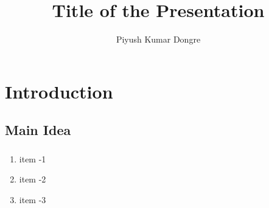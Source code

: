 \documentclass[aspectratio=169]{beamer}
\title[Short Title]{Title of the Presentation}
\author[Piyush]{Piyush Kumar Dongre}
\begin{document}
\begin{frame}
    \titlepage
\end{frame}

\section{Introduction}\label{sec:introduction}


\subsection{Main Idea}\label{sec:mainidea}
\begin{frame}
    \frametitle{\subsecname}
    \begin{enumerate}
        \item item -1

              \vspace{1cm}

        \item item -2

              \vspace{1cm}

        \item item -3



    \end{enumerate}
\end{frame}


\end{document}
